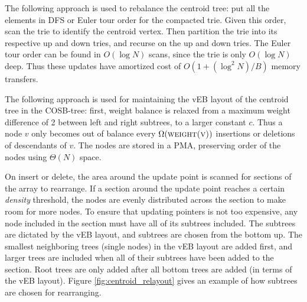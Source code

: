\documentclass[preprint]{style}
\begin{document}

The following approach is used to rebalance the centroid tree: put all the
elements in DFS or Euler tour order for the compacted trie. Given this order,
scan the trie to identify the centroid vertex. Then partition the trie into its
respective up and down tries, and recurse on the up and down tries. The Euler
tour order can be found in $O(\log{N})$ scans, since the trie is only
$O(\log{N})$ deep. Thus these updates have amortized cost of
$O(1+(\log^{2}{N})/B)$ memory transfers.

The following approach is used for maintaining the vEB layout of the centroid
tree in the COSB-tree: first, weight balance is relaxed from a maximum weight
difference of 2 between left and right subtrees, to a larger constant $c$. Thus
a node $v$ only becomes out of balance every $\Omega(\textsc{weight(v)})$
insertions or deletions of descendants of $v$. The nodes are stored in a PMA,
preserving order of the nodes using $\Theta(N)$ space.

On insert or delete, the area around the update point is scanned for sections
of the array to rearrange. If a section around the update point reaches a
certain \textit{density} threshold, the nodes are evenly distributed across the
section to make room for more nodes. To ensure that updating pointers is not too
expensive, any node included in the section must have all of its subtrees
included. The subtrees are dictated by the vEB layout, and subtrees are chosen
from the bottom up. The smallest neighboring trees (single nodes) in the vEB
layout are added first, and larger trees are included when all of their
subtrees have been added to the section. Root trees are only added after all
bottom trees are added (in terms of the vEB layout). Figure
\ref{fig:centroid_relayout} gives an example of how subtrees are chosen for
rearranging.
\end{document}
